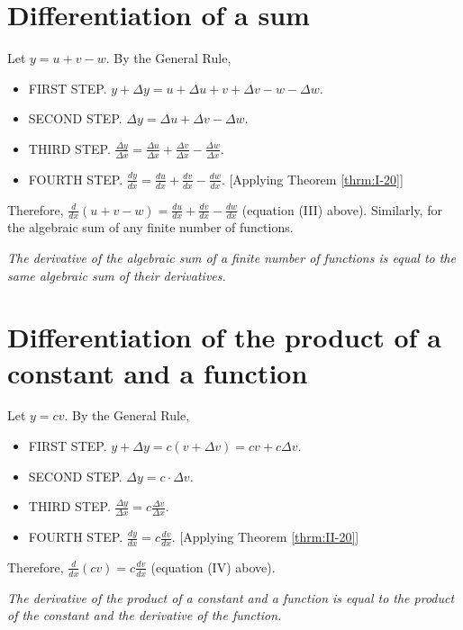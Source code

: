 \section{Differentiation of a sum}

Let $y 	= u + v - w$.
By the General Rule,

\begin{itemize}
\item
FIRST STEP. $y + \Delta y = u + \Delta u + v + \Delta v - w - \Delta w$.
\item
SECOND STEP. $\Delta y 	= \Delta u + \Delta v - \Delta w$.
\item
THIRD STEP. $\frac{\Delta y}{\Delta x} 	
= \frac{\Delta u}{\Delta x} + \frac{\Delta v}{\Delta x} 
- \frac{\Delta w}{\Delta x}$.
\item
FOURTH STEP. $\frac{dy}{dx} = \frac{du}{dx} + \frac{dv}{dx} - \frac{dw}{dx}$.
[Applying Theorem \ref{thrm:I-20}]%
\end{itemize}
Therefore,
$\frac{d}{dx} (u + v - w) = \frac{du}{dx} + \frac{dv}{dx} - \frac{dw}{dx}$
(equation (III) above). %
Similarly, for the algebraic sum of any finite number of functions.

{\it The derivative of the algebraic sum of a finite number of functions 
is equal to the same algebraic sum of their derivatives.}

\section{Differentiation of the product of a constant and a function}

Let $y 	= cv$. By the General Rule,

\begin{itemize}
\item
FIRST STEP. $y + \Delta y = c(v + \Delta v) = cv + c\Delta v$.
\item
SECOND STEP. $	\Delta y = c \cdot \Delta v$.
\item
THIRD STEP. $\frac{\Delta y}{\Delta x} 	= c\frac{\Delta v}{\Delta x}$.
\item
FOURTH STEP. $\frac{dy}{dx} = c\frac{dv}{dx}$.
[Applying Theorem \ref{thrm:II-20}] %
\end{itemize}
Therefore,
$\frac{d}{dx}(cv) 	= c\frac{dv}{dx}$
(equation (IV) above). %

{\it The derivative of the product of a constant and a function 
is equal to the product of the constant and the derivative of the function.}

